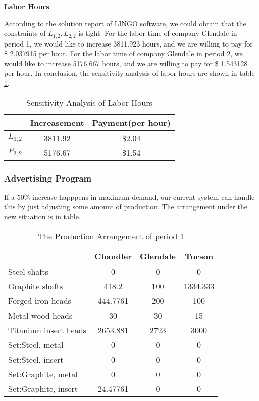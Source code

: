 \documentclass[12pt]{article}
\begin{document}
\noindent\textbf{ Labor Hours}

\noindent According to the solution report of LINGO software, we could obtain that the constraints of $L_{1,2},L_{2,2}$ is tight. For the labor time of company Glendale in period 1, we would like to increase 3811.923 hours, and we are willing to pay for \$ 2.037915 per hour. For the labor time of company Glendale in period 2, we would like to increase 5176.667 hours, and we are willing to pay for \$ 1.543128 per hour. In conclusion, the sensitivity analysis of labor hours are shown in table \ref{tab18}.
\begin{table}[H]
	\centering
	\setlength{\belowcaptionskip}{0.1cm}
	\caption{Sensitivity Analysis of Labor Hours}
	\label{tab18}
	\begin{tabular}{ccc}
		\hline
		\hline
		&Increasement&Payment(per hour)\\
		\hline
		$L_{1,2}$&3811.92&\$2.04\\
		$P_{2,2}$&5176.67&\$1.54\\
		\hline
	\end{tabular}
\end{table}

\subsubsection{Advertising Program}
\noindent If a 50\% increase happpens in maximum demand, our current system can handle this by just adjusting some amount of production. The arrangement under the new situation is in table.

		\begin{table}[H]
	\centering
	\setlength{\belowcaptionskip}{0.1cm}
	\caption{The Production Arrangement of period 1}
	\label{tab19}
	\begin{tabular}{lccc}
		\hline
		\hline
		&Chandler&Glendale&	Tucson\\
		\hline
		Steel shafts& 0&0&0\\
		Graphite shafts&  418.2&100&1334.333\\
		Forged iron heads& 444.7761 &200&100\\
		Metal wood heads&30&30&15\\
		Titanium insert heads&2653.881&2723&3000\\
		Set:Steel, metal&0&0&0\\
		Set:Steel, insert&0&0&0\\
		Set:Graphite, metal&0&0&0\\
		Set:Graphite, insert&24.47761&0&0\\
		\hline
		\hline
	\end{tabular}
\end{table}
\end{document}
